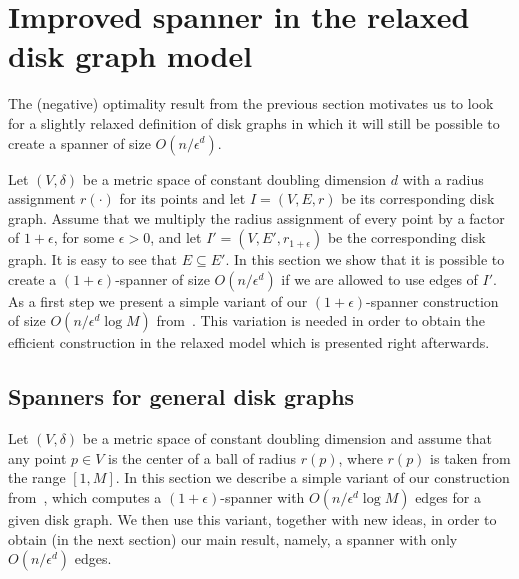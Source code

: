 \documentclass[proceedings]{stacs}
\theoremstyle{plain}\newtheorem{satz}[thm]{Satz}
\theoremstyle{definition}\newtheorem{crucial}[thm]{Crucial Definition}
\newcommand{\eps}{\epsilon}
\begin{document}
\section{Improved spanner in the relaxed disk graph model}
\label{s:DG-3}


The (negative) optimality result from the previous section
motivates us to look for a slightly relaxed definition of disk
graphs in which it will still be possible to create a spanner of
size $O(n/\eps^d)$.

Let $(V,\delta)$ be a metric space of constant doubling dimension
$d$ with a radius assignment $r(\cdot)$ for its points and let
$I=(V,E,r)$ be its corresponding disk graph. Assume that we
multiply the radius assignment of every point by a factor of
$1+\eps$, for some $\eps>0$, and let $I'=(V,E',r_{1+\eps})$ be the
corresponding disk graph. It is easy to see that $E\subseteq E'$.
In this section we show that it is possible to create a
$(1+\eps)$-spanner of size $O(n/\eps^d)$ if we are allowed to use
edges of $I'$. As a first step we present a simple variant of our
$(1+\eps)$-spanner construction of size $O(n/\eps^d\log M)$
from~\cite{PeRo08}. This variation is needed in order to obtain
the efficient construction in the relaxed model which is presented
right afterwards.

\subsection{Spanners for general disk graphs} \label{s:DG}


Let $(V,\delta)$ be a metric space of constant doubling dimension
and assume that any point $p\in V$ is the center of a ball of
radius $r(p)$, where $r(p)$ is taken from the range $[1,M]$. In
this section we describe a simple variant of our construction
from~\cite{PeRo08}, which computes a $(1+\epsilon)$-spanner with
$O(n/\epsilon^{d}\log M)$ edges for a given disk graph. We then
use this variant, together with new ideas, in order to obtain (in
the next section) our main result, namely, a spanner with only
$O(n/\epsilon^{d})$ edges.
\end{document}
